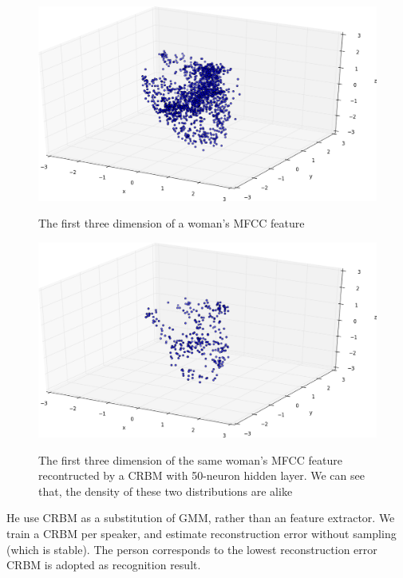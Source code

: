 \begin{enumerate}
			\begin{figure}[!ht]
				\begin{minipage}{0.48\linewidth}
					\centering
					\includegraphics[width=\linewidth]{img/all.trimed.png}
					\caption{The first three dimension of a woman's MFCC feature}
				\end{minipage}
				\hfill
				\begin{minipage}{0.48\linewidth}
					\centering
					\includegraphics[width=\linewidth]{img/50.trimed.png}
					\caption{The first three dimension of the same woman's MFCC feature
					recontructed by a CRBM with 50-neuron hidden layer. We can
					see that, the density of these two distributions are alike}
				\end{minipage}
                \caption{\label{fig:crbm}}
			\end{figure}

			He use CRBM as a substitution of GMM, rather than
			an feature extractor. We train a CRBM per speaker,
			and estimate reconstruction error without sampling (which is stable).
			The person corresponds to the lowest reconstruction error CRBM is adopted as
			recognition result.



\end{enumerate}
